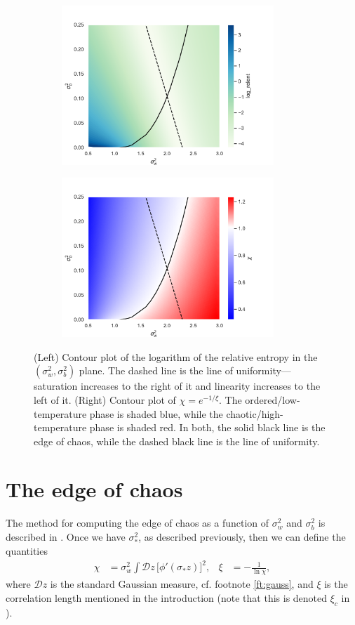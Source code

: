 \begin{figure}[t!]
	\centering
	\begin{subfigure}{0.5\linewidth}
		\centering
		\includegraphics[width=8cm]{figures/chapter4/log_relent_plot_GnBu.pdf}
	\end{subfigure}%
	\begin{subfigure}{0.5\linewidth}
		\centering
		\includegraphics[width=8cm]{figures/chapter4/chi_plot.pdf}
	\end{subfigure}
	\caption{(Left) Contour plot of the logarithm of the relative entropy in the $(\sigma_{w}^{2},\sigma_{b}^{2})$ plane. The dashed line is the line of uniformity---saturation increases to the right of it and linearity increases to the left of it. (Right) Contour plot of $\chi=e^{-1/\xi}$. The ordered/low-temperature phase is shaded blue, while the chaotic/high-temperature phase is shaded red. In both, the solid black line is the edge of chaos, while the dashed black line is the line of uniformity.}
	\label{fig:loueoc}
\end{figure}

\section{The edge of chaos}

The method for computing the edge of chaos as a function of $\sigma_{w}^{2}$ and $\sigma_{b}^{2}$ is described in \cite{arxiv.1606.05340,2016arXiv161101232S}. Once we have $\sigma_{*}^{2}$, as described previously, then we can define the quantities
%
\begin{align} \label{eq:corlength}
	\chi &= \sigma_{w}^{2} \int \mathcal{D} z \, \bigl[ \phi ' ( \sigma_* z ) \bigr]^2, &%
	\xi &= - \frac{1}{\ln \chi},
\end{align}
%
where $\mathcal{D} z$ is the standard Gaussian measure, cf. footnote \ref{ft:gauss}, and $\xi$ is the correlation length mentioned in the introduction (note that this is denoted $\xi_c$ in \cite{2016arXiv161101232S}). 

